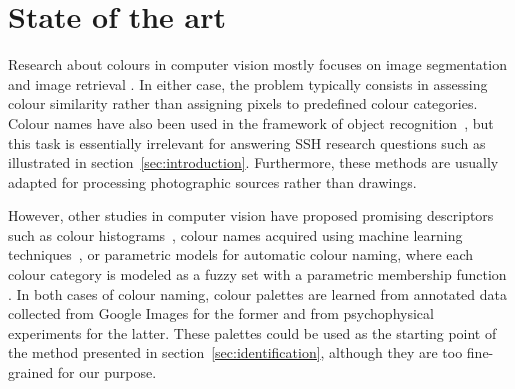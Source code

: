 \documentclass[11pt,a4paper]{article}
\begin{document}
\section{State of the art}
\label{sec:state_of_the_art}

Research about colours in computer vision mostly focuses on image segmentation \cite[see e.g.][]{ChengSun2000,ChenPappasMojsilovicEtAl2005,HanmandluVermaSusanEtAl2013} and image retrieval \cite[see e.g.][]{DengManjunathKenneyEtAl2001,RaoKumar2015,ZhangZhangYaoEtAl2016}. In either case, the problem typically consists in assessing colour similarity rather than assigning pixels to predefined colour categories. Colour names have also been used in the framework of object recognition~\cite[see e.g.][]{khan2013}, but this task is essentially irrelevant for answering SSH research questions such as illustrated in section~\ref{sec:introduction}. Furthermore, these methods are usually adapted for processing photographic sources rather than drawings.




However, other studies in computer vision have proposed promising descriptors such as colour histograms~\cite[see e.g.][]{sun2006}, colour names acquired using machine learning techniques~\cite{weijer2009, lindner2013}, or parametric models for automatic colour naming, where each colour category is modeled as a fuzzy set with a parametric membership function \cite{benavente2008}. In both cases of colour naming, colour palettes are learned from annotated data collected from Google Images for the former and from psychophysical experiments for the latter. These palettes could be used as the starting point of the method presented in section~\ref{sec:identification}, although they are too fine-grained for our purpose.
\end{document}
